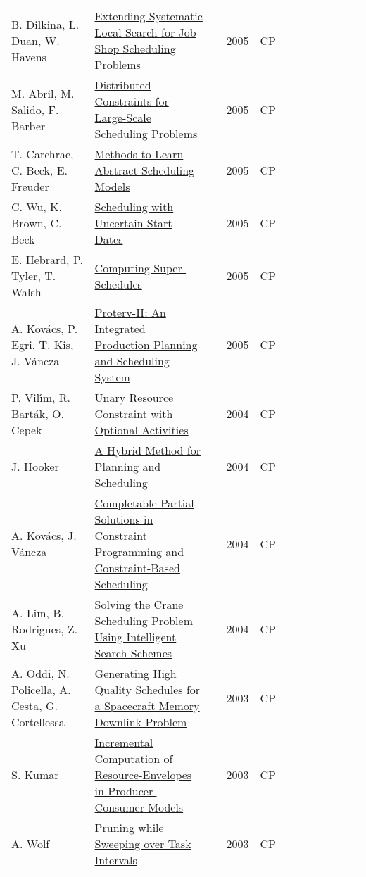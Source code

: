 \documentclass[a4paper]{article}
\begin{document}
{\begin{longtable}{p{3cm}p{6cm}rrcrlcccp{1.5cm}l}
B. Dilkina, L. Duan, W. Havens& \href{papers/DilkinaDH05.pdf}{Extending Systematic Local Search for Job Shop Scheduling Problems} & \cite{DilkinaDH05} & 2005 & CP & & & & & & & \\
M. Abril, M. Salido, F. Barber& \href{papers/AbrilSB05.pdf}{Distributed Constraints for Large-Scale Scheduling Problems} & \cite{AbrilSB05} & 2005 & CP & & & & & & & \\
T. Carchrae, C. Beck, E. Freuder& \href{papers/CarchraeBF05.pdf}{Methods to Learn Abstract Scheduling Models} & \cite{CarchraeBF05} & 2005 & CP & & & & & & & \\
C. Wu, K. Brown, C. Beck& \href{papers/WuBB05.pdf}{Scheduling with Uncertain Start Dates} & \cite{WuBB05} & 2005 & CP & & & & & & & \\
E. Hebrard, P. Tyler, T. Walsh& \href{papers/HebrardTW05.pdf}{Computing Super-Schedules} & \cite{HebrardTW05} & 2005 & CP & & & & & & & \\
A. Kov{\'{a}}cs, P. Egri, T. Kis, J. V{\'{a}}ncza& \href{papers/KovacsEKV05.pdf}{Proterv-II: An Integrated Production Planning and Scheduling System} & \cite{KovacsEKV05} & 2005 & CP & & & & & & & \\
P. Vil{\'{\i}}m, R. Bart{\'{a}}k, O. Cepek& \href{papers/VilimBC04.pdf}{Unary Resource Constraint with Optional Activities} & \cite{VilimBC04} & 2004 & CP & & & & & & & \\
J. Hooker & \href{papers/Hooker04.pdf}{A Hybrid Method for Planning and Scheduling} & \cite{Hooker04} & 2004 & CP & & & & & & & \\
A. Kov{\'{a}}cs, J. V{\'{a}}ncza& \href{papers/KovacsV04.pdf}{Completable Partial Solutions in Constraint Programming and Constraint-Based Scheduling} & \cite{KovacsV04} & 2004 & CP & & & & & & & \\
A. Lim, B. Rodrigues, Z. Xu& \href{papers/LimRX04.pdf}{Solving the Crane Scheduling Problem Using Intelligent Search Schemes} & \cite{LimRX04} & 2004 & CP & & & & & & & \\
A. Oddi, N. Policella, A. Cesta, G. Cortellessa& \href{papers/OddiPCC03.pdf}{Generating High Quality Schedules for a Spacecraft Memory Downlink Problem} & \cite{OddiPCC03} & 2003 & CP & & & & & & & \\
S. Kumar & \href{papers/Kumar03.pdf}{Incremental Computation of Resource-Envelopes in Producer-Consumer Models} & \cite{Kumar03} & 2003 & CP & & & & & & & \\
A. Wolf & \href{papers/Wolf03.pdf}{Pruning while Sweeping over Task Intervals} & \cite{Wolf03} & 2003 & CP & & & & & & & \\

\end{longtable}}
\end{document}
